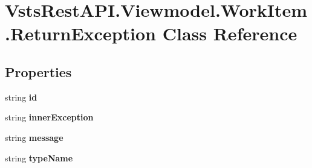 \hypertarget{class_vsts_rest_a_p_i_1_1_viewmodel_1_1_work_item_1_1_return_exception}{}\section{Vsts\+Rest\+A\+P\+I.\+Viewmodel.\+Work\+Item.\+Return\+Exception Class Reference}
\label{class_vsts_rest_a_p_i_1_1_viewmodel_1_1_work_item_1_1_return_exception}
\subsection*{Properties}
\begin{DoxyCompactItemize}
\item 
\mbox{\label{class_vsts_rest_a_p_i_1_1_viewmodel_1_1_work_item_1_1_return_exception_a51989d31d0d16a238c26618b6665ea57}} 
string {\bfseries id}
\item 
\mbox{\label{class_vsts_rest_a_p_i_1_1_viewmodel_1_1_work_item_1_1_return_exception_a00b0af108d6945ae2b8596f69d415df1}} 
string {\bfseries inner\+Exception}
\item 
\mbox{\label{class_vsts_rest_a_p_i_1_1_viewmodel_1_1_work_item_1_1_return_exception_a17922f8541bdbe246f297b2acc23a93b}} 
string {\bfseries message}
\item 
\mbox{\label{class_vsts_rest_a_p_i_1_1_viewmodel_1_1_work_item_1_1_return_exception_aaa7297bec34f6fcd5c58a81959158c01}} 
string {\bfseries type\+Name}
\item 
\mbox{\label{class_vsts_rest_a_p_i_1_1_viewmodel_1_1_work_item_1_1_return_exception_aa06536d9bb6bce613845e07bb05fc2c3}} 

\end{DoxyCompactItemize}

